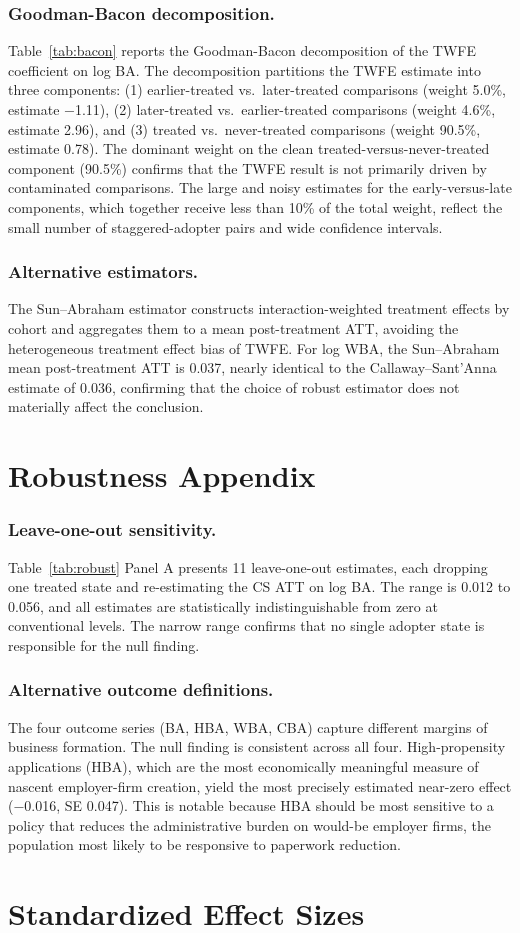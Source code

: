 \documentclass[12pt]{article}
\begin{document}
\subsubsection*{Goodman-Bacon decomposition.}
Table~\ref{tab:bacon} reports the Goodman-Bacon decomposition of the TWFE coefficient on log BA. The decomposition partitions the TWFE estimate into three components: (1) earlier-treated vs.\ later-treated comparisons (weight 5.0\%, estimate $-$1.11), (2) later-treated vs.\ earlier-treated comparisons (weight 4.6\%, estimate 2.96), and (3) treated vs.\ never-treated comparisons (weight 90.5\%, estimate 0.78). The dominant weight on the clean treated-versus-never-treated component (90.5\%) confirms that the TWFE result is not primarily driven by contaminated comparisons. The large and noisy estimates for the early-versus-late components, which together receive less than 10\% of the total weight, reflect the small number of staggered-adopter pairs and wide confidence intervals.

\subsubsection*{Alternative estimators.}
The Sun--Abraham estimator \citep{sun2021} constructs interaction-weighted treatment effects by cohort and aggregates them to a mean post-treatment ATT, avoiding the heterogeneous treatment effect bias of TWFE. For log WBA, the Sun--Abraham mean post-treatment ATT is 0.037, nearly identical to the Callaway--Sant'Anna estimate of 0.036, confirming that the choice of robust estimator does not materially affect the conclusion.

\section{Robustness Appendix}
\label{sec:robust_appendix}

\subsubsection*{Leave-one-out sensitivity.}
Table~\ref{tab:robust} Panel A presents 11 leave-one-out estimates, each dropping one treated state and re-estimating the CS ATT on log BA. The range is 0.012 to 0.056, and all estimates are statistically indistinguishable from zero at conventional levels. The narrow range confirms that no single adopter state is responsible for the null finding.

\subsubsection*{Alternative outcome definitions.}
The four outcome series (BA, HBA, WBA, CBA) capture different margins of business formation. The null finding is consistent across all four. High-propensity applications (HBA), which are the most economically meaningful measure of nascent employer-firm creation, yield the most precisely estimated near-zero effect ($-$0.016, SE 0.047). This is notable because HBA should be most sensitive to a policy that reduces the administrative burden on would-be employer firms, the population most likely to be responsive to paperwork reduction.

\section{Standardized Effect Sizes}
\label{sec:sde}


\end{document}
